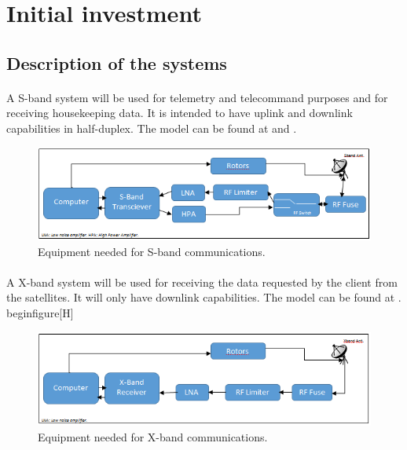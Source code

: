 \section{Initial investment}

\subsection{Description of the systems}

\paragraph{}A S-band system will be used for telemetry and telecommand purposes and for receiving housekeeping data. It is intended to have uplink and downlink capabilities in half-duplex. The model can be found at \cite{SBand} and \cite{SBandDatasheet}.
\begin{figure}[H]
\begin{center}
\includegraphics[scale=1]{SbandEquip.PNG}
\caption[S-band Equipment]{Equipment needed for S-band communications.}
\label{fig:SbandEquip}
\end{center}
\end{figure}

\paragraph{}A X-band system will be used for receiving the data requested by the client from the satellites. It will only have downlink capabilities. The model can be found at \cite{XBand}.
begin{figure}[H]
\begin{figure}[H]
\begin{center}
\includegraphics[scale=1]{XbandEquip.PNG}
\caption[X-band Equipment]{Equipment needed for X-band communications.}
\label{fig:XbandEquip}
\end{center}
\end{figure}

